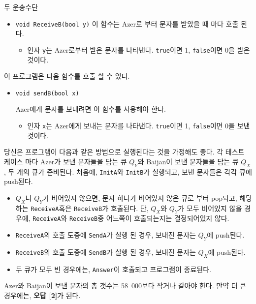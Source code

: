 \begin{problem}{두 운송수단}
\begin{itemize}
		\item \texttt{void ReceiveB(bool y)}
		이 함수는 Azer로 부터 문자를 받았을 때 마다 호출 된다.
		\begin{itemize}
			\item 인자 \texttt{y}는 Azer로부터 받은 문자를 나타낸다. \texttt{true}이면 1, \texttt{false}이면 0을 받은 것이다.
		\end{itemize}
		
	\end{itemize}
	
	이 프로그램은 다음 함수를 호출 할 수 있다.
	
	\begin{itemize}
		\item \texttt{void sendB(bool x)}
		
		Azer에게 문자를 보내려면 이 함수를 사용해야 한다.
		
		\begin{itemize}
			\item 인자 \texttt{x}는 Azer에게 보내는 문자를 나타낸다. \texttt{true}이면 1, \texttt{false}이면 0을 보낸 것이다.
		\end{itemize}
		
	\end{itemize}
		
	
	당신은 프로그램이 다음과 같은 방법으로 실행된다는 것을 가정해도 좋다. 각 테스트 케이스 마다 Azer가 보낸 문자들을 담는 큐 $Q_Y$와 Baijan이 보낸 문자들을 담는 큐 $Q_X$, 두 개의 큐가 준비된다.
	처음에, \texttt{InitA}와 \texttt{InitB}가 실행되고, 보낸 문자들은 각각 큐에 push된다.
	
	\begin{itemize}
		\item $Q_X$나 $Q_Y$가 비어있지 않으면, 문자 하나가 비어있지 않은 큐로 부터 pop되고, 해당하는 \texttt{ReceiveA}혹은 \texttt{ReceiveB}가 호출된다. 단, $Q_X$와 $Q_Y$가 모두 비어있지 않을 경우에, \texttt{ReceiveA}와 \texttt{ReceiveB}중 어느쪽이 호출되는지는 결정되어있지 않다.
		\item \texttt{ReceiveA}의 호출 도중에 \texttt{SendA}가 실행 된 경우, 보내진 문자는 $Q_Y$에 push된다.
		\item \texttt{ReceiveB}의 호출 도중에 \texttt{SendB}가 실행 된 경우, 보내진 문자는 $Q_X$에 push된다.
		\item 두 큐가 모두 빈 경우에는, \texttt{Answer}이 호출되고 프로그램이 종료된다.
	\end{itemize}
	
	Azer와 Baijan이 보낸 문자의 총 갯수는 58\ 000보다 작거나 같아야 한다. 만약 더 큰 경우에는, \textbf{오답 [2]}가 된다.
	

\end{problem}
